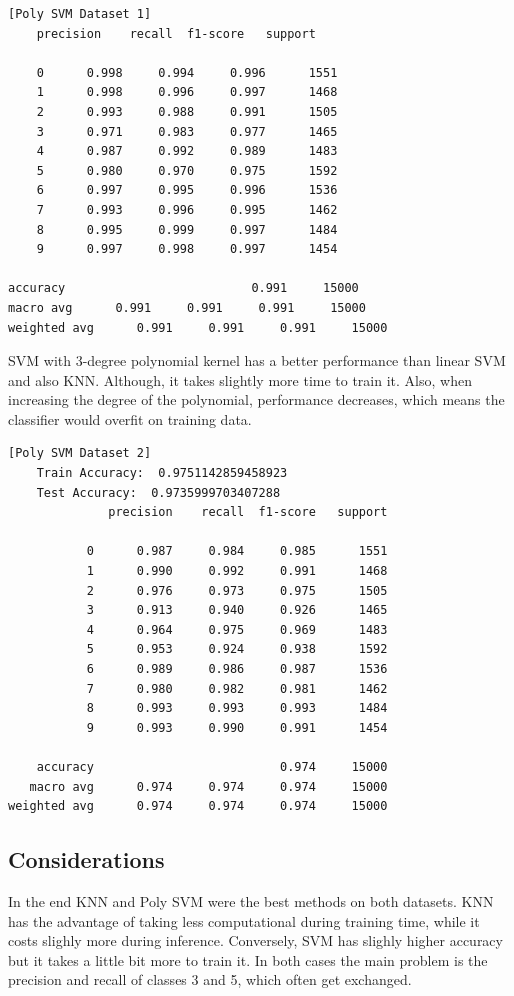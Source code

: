 \documentclass[12pt,a4paper,oneside]{article}
\begin{document}
\begin{verbatim}[Poly SVM Dataset 1]
    precision    recall  f1-score   support

    0      0.998     0.994     0.996      1551
    1      0.998     0.996     0.997      1468
    2      0.993     0.988     0.991      1505
    3      0.971     0.983     0.977      1465
    4      0.987     0.992     0.989      1483
    5      0.980     0.970     0.975      1592
    6      0.997     0.995     0.996      1536
    7      0.993     0.996     0.995      1462
    8      0.995     0.999     0.997      1484
    9      0.997     0.998     0.997      1454

accuracy                          0.991     15000
macro avg      0.991     0.991     0.991     15000
weighted avg      0.991     0.991     0.991     15000
\end{verbatim}

SVM with 3-degree polynomial kernel has a better performance than linear SVM and
also KNN. Although, it takes slightly more time to train it. Also, when
increasing the degree of the polynomial, performance decreases, which means the
classifier would overfit on training data.

\begin{verbatim}[Poly SVM Dataset 2]
    Train Accuracy:  0.9751142859458923
    Test Accuracy:  0.9735999703407288
              precision    recall  f1-score   support

           0      0.987     0.984     0.985      1551
           1      0.990     0.992     0.991      1468
           2      0.976     0.973     0.975      1505
           3      0.913     0.940     0.926      1465
           4      0.964     0.975     0.969      1483
           5      0.953     0.924     0.938      1592
           6      0.989     0.986     0.987      1536
           7      0.980     0.982     0.981      1462
           8      0.993     0.993     0.993      1484
           9      0.993     0.990     0.991      1454

    accuracy                          0.974     15000
   macro avg      0.974     0.974     0.974     15000
weighted avg      0.974     0.974     0.974     15000
\end{verbatim}

\subsection{Considerations}

In the end KNN and Poly SVM were the best methods on both datasets. KNN has the
advantage of taking less computational during training time, while it costs
slighly more during inference. Conversely, SVM has slighly higher accuracy but
it takes a little bit more to train it. In both cases the main problem is the
precision and recall of classes 3 and 5, which often get exchanged.
\end{document}

